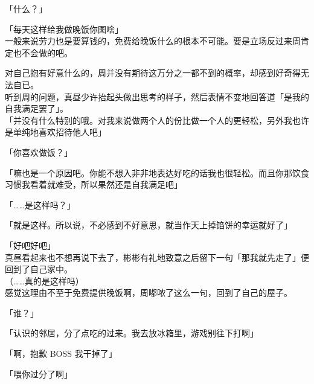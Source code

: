 「什么？」

「每天这样给我做晚饭你图啥」\\

一般来说劳力也是要算钱的，免费给晚饭什么的根本不可能。要是立场反过来周肯定也不会做的吧。

对自己抱有好意什么的，周并没有期待这万分之一都不到的概率，却感到好奇得无法自已。\\

听到周的问题，真昼少许抬起头做出思考的样子，然后表情不变地回答道「是我的自我满足罢了」。\\

「并没有什么特别的哦。对我来说做两个人的份比做一个人的更轻松，另外我也许是单纯地喜欢招待他人吧」

「你喜欢做饭？」

「嘛也是一个原因吧。你能不想入非非地表达好吃的话我也很轻松。而且你那饮食习惯我看着就难受，所以果然还是自我满足吧」

「……是这样吗？」

「就是这样。所以说，不必感到不好意思，就当作天上掉馅饼的幸运就好了」

「好吧好吧」\\

真昼看起来也不想再说下去了，彬彬有礼地致意之后留下一句「那我就先走了」便回到了自己家中。\\

（……真的是这样吗）\\

感觉这理由不至于免费提供晚饭啊，周嘟哝了这么一句，回到了自己的屋子。\\

\vspace{2\baselineskip}

「谁？」

「认识的邻居，分了点吃的过来。我去放冰箱里，游戏别往下打啊」

「啊，抱歉 BOSS 我干掉了」

「喂你过分了啊」
